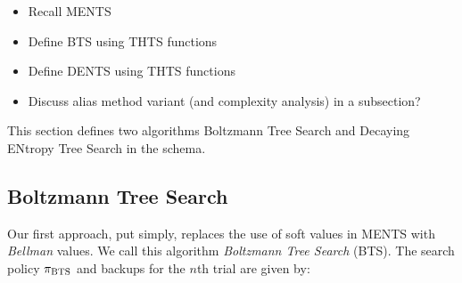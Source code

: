     \begin{itemize}
        \item Recall MENTS
        \item Define BTS using THTS functions
        \item Define DENTS using THTS functions
        \item Discuss alias method variant (and complexity analysis) in a subsection?
    \end{itemize}


    This section defines two algorithms Boltzmann Tree Search and Decaying ENtropy Tree Search in the \thtspp\ewe schema. 
    
    \subsection{Boltzmann Tree Search}
    \label{sec:4-2-1-bts}




        Our first approach, put simply, replaces the use of soft values in MENTS with 
        \textit{Bellman} 
        values. We call this algorithm \textit{Boltzmann Tree Search} (BTS).  The search policy $\pi_{\textnormal{BTS}}$ and backups for the $n$th trial are given by:


